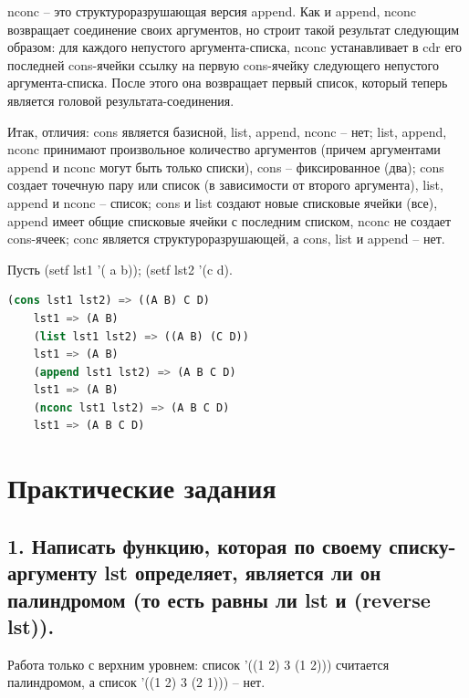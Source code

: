 \documentclass[12pt]{report}
\begin{document}
nconc -- это структуроразрушающая версия append. Как и append, nconc возвращает соединение своих аргументов, но строит такой результат следующим образом: для каждого непустого аргумента-списка, nconc устанавливает в cdr его последней cons-ячейки ссылку на первую cons-ячейку следующего непустого аргумента-списка. После этого она возвращает первый список, который теперь является головой результата-соединения.

Итак, отличия: cons является базисной, list, append, nconc -- нет; list, append, nconc принимают произвольное количество аргументов (причем аргументами append и nconc могут быть только списки), cons -- фиксированное (два); cons создает точечную пару или список (в зависимости от второго аргумента), list, append и nconc -- список; cons и list создают новые списковые ячейки (все), append имеет общие списковые ячейки с последним списком, nconc не создает cons-ячеек; conc является структуроразрушающей, а cons, list и append -- нет.

Пусть (setf lst1 '( a b)); (setf lst2 '(c d).



\begin{lstlisting}[language=Lisp]	
	(cons lst1 lst2) => ((A B) C D)
	lst1 => (A B)
	(list lst1 lst2) => ((A B) (C D))
	lst1 => (A B)
	(append lst1 lst2) => (A B C D)
	lst1 => (A B)
	(nconc lst1 lst2) => (A B C D)
	lst1 => (A B C D)
\end{lstlisting}



	
\chapter*{Практические задания}	

\section*{1. Написать функцию, которая по своему списку-аргументу lst определяет, является ли он палиндромом (то есть равны ли lst и (reverse lst)).}

Работа только с верхним уровнем: список '((1 2) 3 (1 2))) считается палиндромом, а список '((1 2) 3 (2 1))) -- нет.
\end{document}
